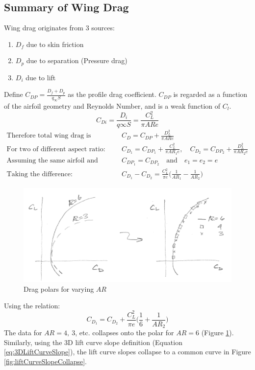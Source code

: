 \documentclass[draft=false, titlepage]{article}
\begin{document}
\subsection{Summary of Wing Drag}
Wing drag originates from 3 sources:
\begin{enumerate}
    \item $D_f$ due to skin friction
    \item $D_p$ due to separation (Pressure drag)
    \item $D_i$ due to lift
\end{enumerate}
Define $C_{DP} = \frac{D_f + D_p}{q_\infty S}$ as the profile drag coefficient. $C_{DP}$ is regarded as a function of the airfoil geometry and Reynolds Number, and is a weak function of $C_l$.
\begin{equation*}
    C_{Di} = \frac{D_i}{q\infty S} = \frac{C_L^2}{\pi AR e}
\end{equation*}
\begin{align*}
\text{Therefore total wing drag is} \quad&
    C_D = C_{DP} + \frac{D_L^2}{\pi AR e}\\
\text{For two of different aspect ratio:} \quad&
    C_{D_1} = C_{DP_1} + \frac{C_L^2}{\pi AR_1 e},\quad C_{D_2} = C_{DP_2} + \frac{D_L^2}{\pi AR_2 e}\\
\text{Assuming the same airfoil and twist:} \quad&
    C_{DP_1} = C_{DP_2} \quad \text{and} \quad e_1 = e_2 = e\\
\text{Taking the difference:} \quad&
    C_{D_1} - C_{D_2} = \frac{C_L^2}{\pi e} \big(\frac{1}{AR_1} - \frac{1}{AR_2}\big)
\end{align*}

\begin{figure}[ht]
    \centering
    \includegraphics[width=0.8\linewidth]{Figures/dragPolarPg122.PNG}
    \caption{Drag polars for varying $AR$}
    \label{fig:dragPolarPg122}
\end{figure}
Using the relation:
\begin{equation*}
    C_{D_1} = C_{D_2} + \frac{C_L^2}{\pi e} \big( \frac{1}{6} + \frac{1}{AR_2}\big)
\end{equation*}
The data for $AR=4,\ 3$, etc. collapses onto the polar for $AR=6$ (Figure \ref{fig:dragPolarPg122}). Similarly, using the 3D lift curve slope definition (Equation \ref{eq:3DLiftCurveSlope}), the lift curve slopes collapse to a common curve in Figure \ref{fig:liftCurveSlopeCollapse}.
\end{document}
